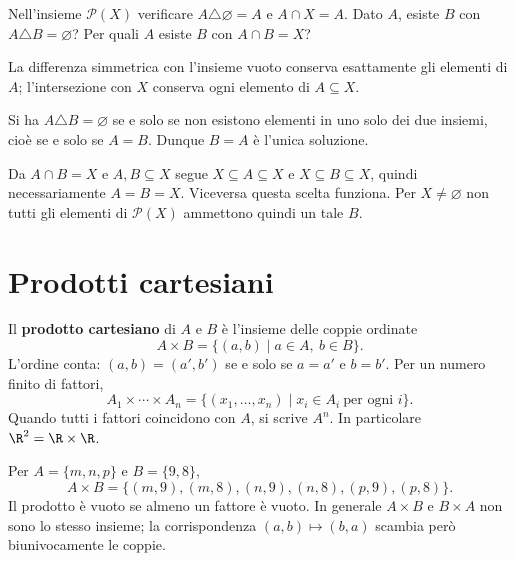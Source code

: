 \begin{esercizio}
Nell'insieme $\mathcal P(X)$ verificare $A\triangle\varnothing=A$ e $A\cap X=A$. Dato $A$, esiste $B$ con $A\triangle B=\varnothing$? Per quali $A$ esiste $B$ con $A\cap B=X$?
\end{esercizio}
\begin{svolgimento}
La differenza simmetrica con l'insieme vuoto conserva esattamente gli elementi di $A$; l'intersezione con $X$ conserva ogni elemento di $A\subseteq X$.

Si ha $A\triangle B=\varnothing$ se e solo se non esistono elementi in uno solo dei due insiemi, cioè se e solo se $A=B$. Dunque $B=A$ è l'unica soluzione.

Da $A\cap B=X$ e $A,B\subseteq X$ segue $X\subseteq A\subseteq X$ e $X\subseteq B\subseteq X$, quindi necessariamente $A=B=X$. Viceversa questa scelta funziona. Per $X\ne\varnothing$ non tutti gli elementi di $\mathcal P(X)$ ammettono quindi un tale $B$.
\end{svolgimento}

\section{Prodotti cartesiani}
\begin{definizione}
Il \textbf{prodotto cartesiano} di $A$ e $B$ è l'insieme delle coppie ordinate
\[
A\times B=\{(a,b)\mid a\in A,\ b\in B\}.
\]
L'ordine conta: $(a,b)=(a',b')$ se e solo se $a=a'$ e $b=b'$. Per un numero finito di fattori,
\[
A_1\times\cdots\times A_n=\{(x_1,\ldots,x_n)\mid x_i\in A_i\ \text{per ogni }i\}.
\]
Quando tutti i fattori coincidono con $A$, si scrive $A^n$. In particolare $\R^2=\R\times\R$.
\end{definizione}

\begin{esempio}
Per $A=\{m,n,p\}$ e $B=\{9,8\}$,
\[
A\times B=\{(m,9),(m,8),(n,9),(n,8),(p,9),(p,8)\}.
\]
Il prodotto è vuoto se almeno un fattore è vuoto. In generale $A\times B$ e $B\times A$ non sono lo stesso insieme; la corrispondenza $(a,b)\mapsto(b,a)$ scambia però biunivocamente le coppie.
\end{esempio}
